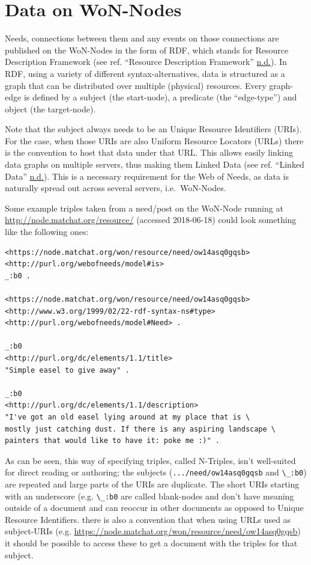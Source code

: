 \documentclass[a4paper,,tablecaptionabove]{scrbook}
\newcommand{\passthrough}[1]{#1}
\begin{document}
\hypertarget{sec:data-on-won-nodes}{%
\section{Data on WoN-Nodes}\label{sec:data-on-won-nodes}}

Needs, connections between them and any events on those connections are
published on the WoN-Nodes in the form of RDF, which stands for Resource
Description Framework (see ref. ``Resource Description Framework''
\protect\hyperlink{ref-ResourceDescriptionFramework}{n.d.}). In RDF,
using a variety of different syntax-alternatives, data is structured as
a graph that can be distributed over multiple (physical) resources.
Every graph-edge is defined by a subject (the start-node), a predicate
(the \enquote{edge-type}) and object (the target-node).

Note that the subject always needs to be an Unique Resource Identifiers
(URIs). For the case, when those URIs are also Uniform Resource Locators
(URLs) there is the convention to host that data under that URL. This
allows easily linking data graphs on multiple servers, thus making them
Linked Data (see ref. ``Linked Data''
\protect\hyperlink{ref-Linkeddata}{n.d.}). This is a necessary
requirement for the Web of Needs, as data is naturally spread out across
several servers, i.e.~WoN-Nodes.

Some example triples taken from a need/post on the WoN-Node running at
\url{http://node.matchat.org/resource/} (accessed 2018-06-18) could look
something like the following ones:

\begin{lstlisting}[caption={Excerpt of a need description (N-Triples)}, label=fig:needtriples]
<https://node.matchat.org/won/resource/need/ow14asq0gqsb>
<http://purl.org/webofneeds/model#is>
_:b0 .

<https://node.matchat.org/won/resource/need/ow14asq0gqsb>
<http://www.w3.org/1999/02/22-rdf-syntax-ns#type>
<http://purl.org/webofneeds/model#Need> .

_:b0
<http://purl.org/dc/elements/1.1/title>
"Simple easel to give away" .

_:b0
<http://purl.org/dc/elements/1.1/description>
"I've got an old easel lying around at my place that is \
mostly just catching dust. If there is any aspiring landscape \
painters that would like to have it: poke me :)" .
\end{lstlisting}

As can be seen, this way of specifying triples, called N-Triples, isn't
well-suited for direct reading or authoring; the subjects
(\passthrough{\lstinline!.../need/ow14asq0gqsb!} and
\passthrough{\lstinline!\_:b0!}) are repeated and large parts of the
URIs are duplicate. The short URIs starting with an underscore (e.g.
\passthrough{\lstinline!\_:b0!} are called blank-nodes and don't have
meaning outside of a document and can reoccur in other documents as
opposed to Unique Resource Identifiers. there is also a convention that
when using URLs used as subject-URIs (e.g.
\url{https://node.matchat.org/won/resource/need/ow14asq0gqsb}) it should
be possible to access these to get a document with the triples for that
subject.
\end{document}
